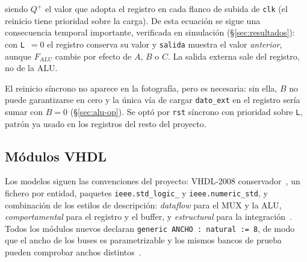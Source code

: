 \documentclass[llncs]{llncs}
\begin{document}
\noindent siendo $Q^{+}$ el valor que adopta el registro en cada flanco de
subida de \texttt{clk} (el reinicio tiene prioridad sobre la carga). De
esta ecuación se sigue una consecuencia temporal importante, verificada en
simulación (§\ref{sec:resultados}): con \texttt{L}~$=0$ el registro
conserva su valor y \texttt{salida} muestra el valor \emph{anterior},
aunque $F_{ALU}$ cambie por efecto de $A$, $B$ o $C$. La salida externa
sale del registro, no de la ALU.

El reinicio síncrono no aparece en la fotografía, pero es necesaria: sin
ella, $B$ no puede garantizarse en cero y la única vía de cargar
\texttt{dato\_ext} en el registro sería sumar con $B=0$ (§\ref{sec:alu-op}).
Se optó por \texttt{rst} síncrono con prioridad sobre \texttt{L}, patrón ya
usado en los registros del resto del proyecto.

\subsection{Módulos VHDL}
\label{sec:modulos}

Los modelos siguen las convenciones del proyecto: VHDL-2008
conservador~\cite{ieee1076_2008}, un fichero por entidad, paquetes
\texttt{ieee.std\_\-logic\_} y \texttt{ieee.numeric\_\-std}, y
combinación
de los estilos de descripción: \emph{dataflow} para el MUX y la ALU,
\emph{comportamental} para el registro y el buffer, y \emph{estructural}
para la integración~\cite{navabi1998vhdl}. Todos los módulos nuevos
declaran \texttt{generic ANCHO : natural := 8}, de modo que el ancho de los
buses es parametrizable y los mismos bancos de prueba pueden comprobar
anchos distintos~\cite{harris2015ddca}.
\end{document}
